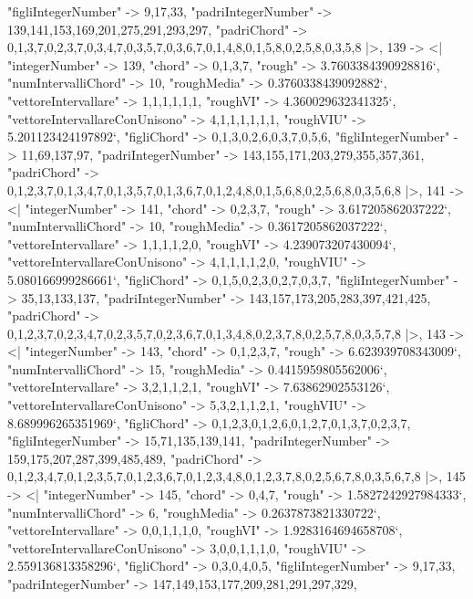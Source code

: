 \documentclass[
]{article}
\begin{document}
\begin{DatasetVerbatim}
    "figliIntegerNumber" -> {9,17,33},
    "padriIntegerNumber" -> {139,141,153,169,201,275,291,293,297},
    "padriChord" -> {{0,1,3,7},{0,2,3,7},{0,3,4,7},{0,3,5,7},{0,3,6,7},{0,1,4,8},{0,1,5,8},{0,2,5,8},{0,3,5,8}}
  |>,
  139 -> <|
    "integerNumber" -> 139,
    "chord" -> {0,1,3,7},
    "rough" -> 3.7603384390928816`,
    "numIntervalliChord" -> 10,
    "roughMedia" -> 0.3760338439092882`,
    "vettoreIntervallare" -> {1,1,1,1,1,1},
    "roughVI" -> 4.360029632341325`,
    "vettoreIntervallareConUnisono" -> {4,1,1,1,1,1,1},
    "roughVIU" -> 5.201123424197892`,
    "figliChord" -> {{0,1,3},{0,2,6},{0,3,7},{0,5,6}},
    "figliIntegerNumber" -> {11,69,137,97},
    "padriIntegerNumber" -> {143,155,171,203,279,355,357,361},
    "padriChord" -> {{0,1,2,3,7},{0,1,3,4,7},{0,1,3,5,7},{0,1,3,6,7},{0,1,2,4,8},{0,1,5,6,8},{0,2,5,6,8},{0,3,5,6,8}}
  |>,
  141 -> <|
    "integerNumber" -> 141,
    "chord" -> {0,2,3,7},
    "rough" -> 3.617205862037222`,
    "numIntervalliChord" -> 10,
    "roughMedia" -> 0.3617205862037222`,
    "vettoreIntervallare" -> {1,1,1,1,2,0},
    "roughVI" -> 4.239073207430094`,
    "vettoreIntervallareConUnisono" -> {4,1,1,1,1,2,0},
    "roughVIU" -> 5.080166999286661`,
    "figliChord" -> {{0,1,5},{0,2,3},{0,2,7},{0,3,7}},
    "figliIntegerNumber" -> {35,13,133,137},
    "padriIntegerNumber" -> {143,157,173,205,283,397,421,425},
    "padriChord" -> {{0,1,2,3,7},{0,2,3,4,7},{0,2,3,5,7},{0,2,3,6,7},{0,1,3,4,8},{0,2,3,7,8},{0,2,5,7,8},{0,3,5,7,8}}
  |>,
  143 -> <|
    "integerNumber" -> 143,
    "chord" -> {0,1,2,3,7},
    "rough" -> 6.623939708343009`,
    "numIntervalliChord" -> 15,
    "roughMedia" -> 0.4415959805562006`,
    "vettoreIntervallare" -> {3,2,1,1,2,1},
    "roughVI" -> 7.63862902553126`,
    "vettoreIntervallareConUnisono" -> {5,3,2,1,1,2,1},
    "roughVIU" -> 8.689996265351969`,
    "figliChord" -> {{0,1,2,3},{0,1,2,6},{0,1,2,7},{0,1,3,7},{0,2,3,7}},
    "figliIntegerNumber" -> {15,71,135,139,141},
    "padriIntegerNumber" -> {159,175,207,287,399,485,489},
    "padriChord" -> {{0,1,2,3,4,7},{0,1,2,3,5,7},{0,1,2,3,6,7},{0,1,2,3,4,8},{0,1,2,3,7,8},{0,2,5,6,7,8},{0,3,5,6,7,8}}
  |>,
  145 -> <|
    "integerNumber" -> 145,
    "chord" -> {0,4,7},
    "rough" -> 1.5827242927984333`,
    "numIntervalliChord" -> 6,
    "roughMedia" -> 0.2637873821330722`,
    "vettoreIntervallare" -> {0,0,1,1,1,0},
    "roughVI" -> 1.9283164694658708`,
    "vettoreIntervallareConUnisono" -> {3,0,0,1,1,1,0},
    "roughVIU" -> 2.559136813358296`,
    "figliChord" -> {{0,3},{0,4},{0,5}},
    "figliIntegerNumber" -> {9,17,33},
    "padriIntegerNumber" -> {147,149,153,177,209,281,291,297,329},

\end{DatasetVerbatim}
\end{document}

